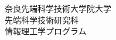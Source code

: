 \renewcommand\thepage{Title1}
\thispagestyle{empty}
{\raggedleft

}
\vspace*{9truemm}
\begin{center}
 \Large\bfseries\jdoctitle
\end{center}
\vspace*{27truemm}
\begin{center}
 \Large\bfseries\jtitle
\end{center}
\vspace*{18truemm}
\begin{center}
 \Large\jauthor
\end{center}
\vspace*{50truemm}
\begin{center}
 \jdate
\end{center}
\vspace*{4.5truemm}
\begin{center}
 奈良先端科学技術大学院大学 \\
 先端科学技術研究科 \\
 情報理工学プログラム
\end{center}
\vspace*{\fill}
